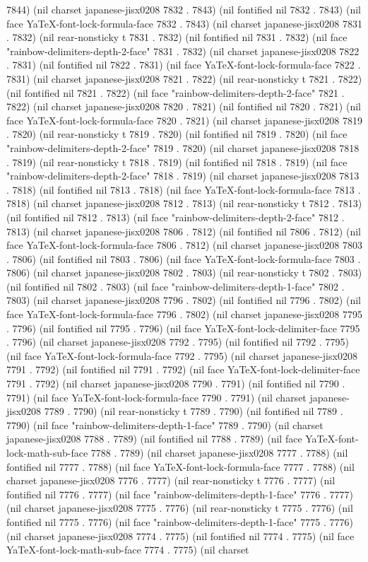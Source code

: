 7844) (nil charset japanese-jisx0208 7832 . 7843) (nil fontified nil 7832 . 7843) (nil face YaTeX-font-lock-formula-face 7832 . 7843) (nil charset japanese-jisx0208 7831 . 7832) (nil rear-nonsticky t 7831 . 7832) (nil fontified nil 7831 . 7832) (nil face "rainbow-delimiters-depth-2-face" 7831 . 7832) (nil charset japanese-jisx0208 7822 . 7831) (nil fontified nil 7822 . 7831) (nil face YaTeX-font-lock-formula-face 7822 . 7831) (nil charset japanese-jisx0208 7821 . 7822) (nil rear-nonsticky t 7821 . 7822) (nil fontified nil 7821 . 7822) (nil face "rainbow-delimiters-depth-2-face" 7821 . 7822) (nil charset japanese-jisx0208 7820 . 7821) (nil fontified nil 7820 . 7821) (nil face YaTeX-font-lock-formula-face 7820 . 7821) (nil charset japanese-jisx0208 7819 . 7820) (nil rear-nonsticky t 7819 . 7820) (nil fontified nil 7819 . 7820) (nil face "rainbow-delimiters-depth-2-face" 7819 . 7820) (nil charset japanese-jisx0208 7818 . 7819) (nil rear-nonsticky t 7818 . 7819) (nil fontified nil 7818 . 7819) (nil face "rainbow-delimiters-depth-2-face" 7818 . 7819) (nil charset japanese-jisx0208 7813 . 7818) (nil fontified nil 7813 . 7818) (nil face YaTeX-font-lock-formula-face 7813 . 7818) (nil charset japanese-jisx0208 7812 . 7813) (nil rear-nonsticky t 7812 . 7813) (nil fontified nil 7812 . 7813) (nil face "rainbow-delimiters-depth-2-face" 7812 . 7813) (nil charset japanese-jisx0208 7806 . 7812) (nil fontified nil 7806 . 7812) (nil face YaTeX-font-lock-formula-face 7806 . 7812) (nil charset japanese-jisx0208 7803 . 7806) (nil fontified nil 7803 . 7806) (nil face YaTeX-font-lock-formula-face 7803 . 7806) (nil charset japanese-jisx0208 7802 . 7803) (nil rear-nonsticky t 7802 . 7803) (nil fontified nil 7802 . 7803) (nil face "rainbow-delimiters-depth-1-face" 7802 . 7803) (nil charset japanese-jisx0208 7796 . 7802) (nil fontified nil 7796 . 7802) (nil face YaTeX-font-lock-formula-face 7796 . 7802) (nil charset japanese-jisx0208 7795 . 7796) (nil fontified nil 7795 . 7796) (nil face YaTeX-font-lock-delimiter-face 7795 . 7796) (nil charset japanese-jisx0208 7792 . 7795) (nil fontified nil 7792 . 7795) (nil face YaTeX-font-lock-formula-face 7792 . 7795) (nil charset japanese-jisx0208 7791 . 7792) (nil fontified nil 7791 . 7792) (nil face YaTeX-font-lock-delimiter-face 7791 . 7792) (nil charset japanese-jisx0208 7790 . 7791) (nil fontified nil 7790 . 7791) (nil face YaTeX-font-lock-formula-face 7790 . 7791) (nil charset japanese-jisx0208 7789 . 7790) (nil rear-nonsticky t 7789 . 7790) (nil fontified nil 7789 . 7790) (nil face "rainbow-delimiters-depth-1-face" 7789 . 7790) (nil charset japanese-jisx0208 7788 . 7789) (nil fontified nil 7788 . 7789) (nil face YaTeX-font-lock-math-sub-face 7788 . 7789) (nil charset japanese-jisx0208 7777 . 7788) (nil fontified nil 7777 . 7788) (nil face YaTeX-font-lock-formula-face 7777 . 7788) (nil charset japanese-jisx0208 7776 . 7777) (nil rear-nonsticky t 7776 . 7777) (nil fontified nil 7776 . 7777) (nil face "rainbow-delimiters-depth-1-face" 7776 . 7777) (nil charset japanese-jisx0208 7775 . 7776) (nil rear-nonsticky t 7775 . 7776) (nil fontified nil 7775 . 7776) (nil face "rainbow-delimiters-depth-1-face" 7775 . 7776) (nil charset japanese-jisx0208 7774 . 7775) (nil fontified nil 7774 . 7775) (nil face YaTeX-font-lock-math-sub-face 7774 . 7775) (nil charset 